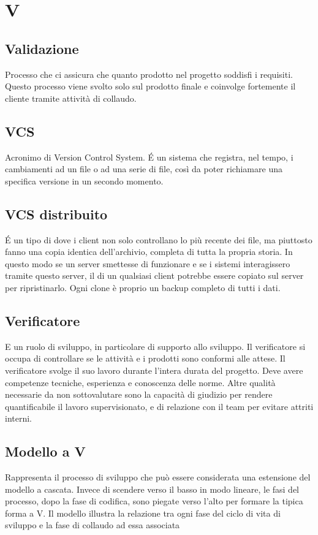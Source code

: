 \section*{V}
\markright{}

\subsection*{Validazione}
Processo che ci assicura che quanto prodotto nel progetto soddisfi i requisiti. Questo processo viene svolto solo sul prodotto finale e coinvolge fortemente il cliente tramite attività di collaudo.

\subsection*{VCS}
Acronimo di Version Control System. \'E un sistema che registra, nel tempo, i cambiamenti ad un file o ad una serie di file, così da poter richiamare una specifica versione in un secondo momento.

\subsection*{VCS distribuito}
\'E un tipo di  dove i client non solo controllano lo  più recente dei file, ma piuttosto fanno una copia identica dell’archivio, completa di tutta la propria storia. In questo modo se un server smettesse di funzionare e se i sistemi interagissero tramite questo server, il  di un qualsiasi client potrebbe essere copiato sul server per ripristinarlo. Ogni clone è proprio un backup completo di tutti i dati.

\subsection*{Verificatore}
E un ruolo di sviluppo, in particolare di supporto allo sviluppo. Il verificatore si occupa di controllare se le attività e i prodotti sono conformi alle attese. Il verificatore svolge il suo lavoro durante l'intera durata del progetto. Deve avere competenze tecniche, esperienza e conoscenza delle norme. Altre qualità necessarie da non sottovalutare sono la capacità di giudizio per rendere quantificabile il lavoro supervisionato, e di relazione con il team per evitare attriti interni.


\subsection*{Modello a V}
Rappresenta il processo di sviluppo  che può essere considerata una estensione del modello a cascata. Invece di scendere verso il basso in modo lineare, le fasi del processo, dopo la fase di codifica, sono piegate verso l'alto per formare la tipica forma a V. Il modello illustra la relazione tra ogni fase del ciclo di vita di sviluppo e la fase di collaudo ad essa associata 